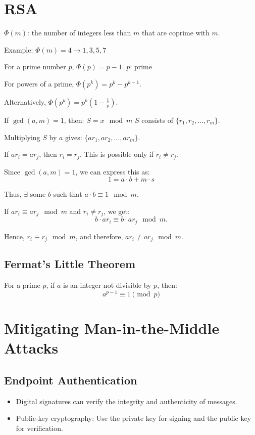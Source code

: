 \documentclass{article}
\begin{document}
\section{RSA}

$\Phi(m)$: the number of integers less than $m$ that are coprime with $m$.

Example: $\Phi(m) = 4 \rightarrow 1, 3, 5, 7$

For a prime number $p$, $\Phi(p) = p - 1$. $p$: prime

For powers of a prime, $\Phi(p^k) = p^k - p^{k-1}$.

Alternatively, $\Phi(p^k) = p^k \left(1 - \frac{1}{p}\right)$.

If $\gcd(a, m) = 1$, then:
$S = x \mod m$
$S$ consists of $\{r_1, r_2, \ldots, r_m\}$.

Multiplying $S$ by $a$ gives: $\{ar_1, ar_2, \ldots, ar_m\}$.

If $ar_i = ar_j$, then $r_i = r_j$. This is possible only if $r_i \neq r_j$.

Since $\gcd(a, m) = 1$, we can express this as:
\[ 1 = a \cdot b + m \cdot s \]

Thus, $\exists$ some $b$ such that $a \cdot b \equiv 1 \mod m$.

If $ar_i \equiv ar_j \mod m$ and $r_i \neq r_j$, we get:
\[ b \cdot ar_i \equiv b \cdot ar_j \mod m. \]

Hence, $r_i \equiv r_j \mod m$, and therefore, $ar_i \neq ar_j \mod m$.

\subsection{Fermat's Little Theorem}

For a prime $p$, if $a$ is an integer not divisible by $p$, then:
\[ a^{p-1} \equiv 1 \pmod{p} \]


\section{Mitigating Man-in-the-Middle Attacks}

\subsection{Endpoint Authentication}
\begin{itemize}
    \item Digital signatures can verify the integrity and authenticity of messages.
    \item Public-key cryptography: Use the private key for signing and the public key for verification.
\end{itemize}
\end{document}
